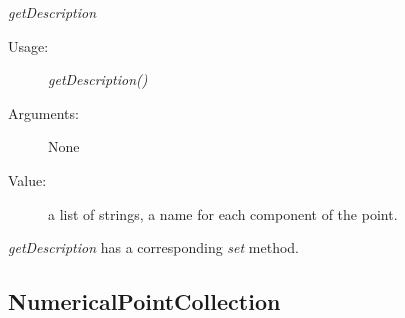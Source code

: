 \begin{description}
\begin{description}
\item \textit{getDescription}
\begin{description}
\item[Usage:] \textit{getDescription()}
\item[Arguments:] None
\item[Value:] a list of strings, a name for each component of the point.
\end{description}
\bigskip

\textit{getDescription} has a corresponding \textit{set} method.

\end{description}

\end{description}




\newpage
\subsection{NumericalPointCollection}

